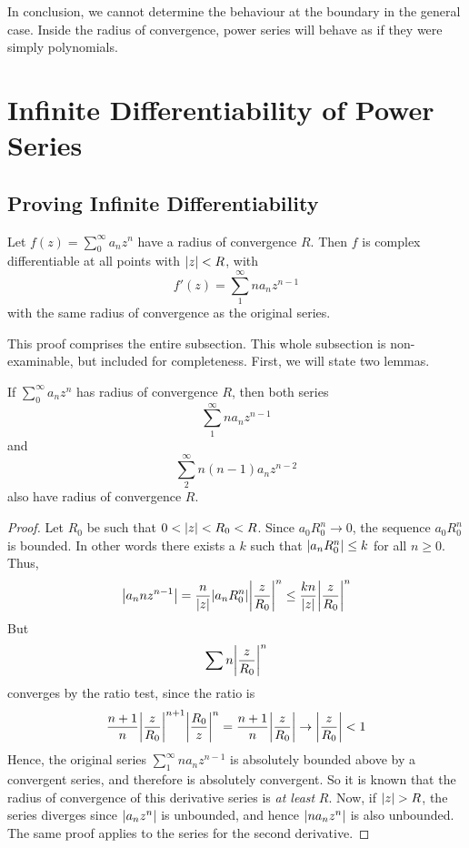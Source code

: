 \documentclass{article}
\begin{document}
\noindent In conclusion, we cannot determine the behaviour at the boundary in the general case. Inside the radius of convergence, power series will behave as if they were simply polynomials.

\section{Infinite Differentiability of Power Series}
\subsection{Proving Infinite Differentiability}
\begin{theorem}
    Let $f(z) = \sum_0^\infty a_n z^n$ have a radius of convergence $R$. Then $f$ is complex differentiable at all points with $\abs{z} < R$, with
    \[ f'(z) = \sum_1^\infty n a_n z^{n-1} \]
    with the same radius of convergence as the original series.
\end{theorem}
\noindent This proof comprises the entire subsection. This whole subsection is non-examinable, but included for completeness. First, we will state two lemmas.
\begin{lemma}
    If $\sum_0^\infty a_n z^n$ has radius of convergence $R$, then both series
    \[ \sum_1^\infty n a_n z^{n-1} \]
    and
    \[ \sum_2^\infty n(n-1)a_n z^{n-2} \]
    also have radius of convergence $R$.
\end{lemma}
\begin{proof}
    Let $R_0$ be such that $0 < \abs{z} < R_0 < R$. Since $a_0 R_0^n \to 0$, the sequence $a_0 R_0^n$ is bounded. In other words there exists a $k$ such that $\abs{a_n R_0^n} \leq k$ for all $n \geq 0$. Thus,
    \[ \abs{a_n n z^{n-1}} = \frac{n}{\abs{z}}\abs{a_n R_0^n} \abs{\frac{z}{R_0}}^n \leq \frac{kn}{\abs{z}}\abs{\frac{z}{R_0}}^n \]
    But
    \[ \sum n\abs{\frac{z}{R_0}}^n \]
    converges by the ratio test, since the ratio is
    \[ \frac{n+1}{n}\abs{\frac{z}{R_0}}^{n+1} \abs{\frac{R_0}{z}}^n = \frac{n+1}{n}\abs{\frac{z}{R_0}} \to \abs{\frac{z}{R_0}} < 1 \]
    Hence, the original series $\sum_1^\infty n a_n z^{n-1}$ is absolutely bounded above by a convergent series, and therefore is absolutely convergent. So it is known that the radius of convergence of this derivative series is \textit{at least} $R$. Now, if $\abs{z} > R$, the series diverges since $\abs{a_n z^n}$ is unbounded, and hence $\abs{n a_n z^n}$ is also unbounded. The same proof applies to the series for the second derivative.
\end{proof}
\end{document}
